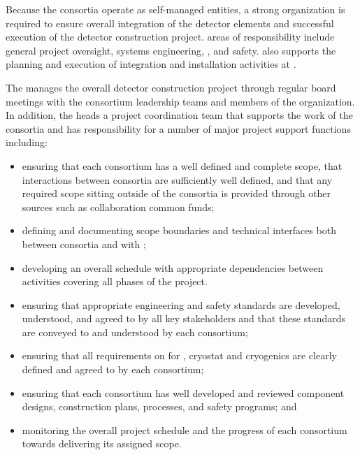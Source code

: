 Because the consortia operate as self-managed entities, a strong
 organization is required to ensure overall integration 
of the detector elements and successful execution of the detector
construction project.   areas of responsibility include 
general project oversight, systems engineering, , and 
safety.   also supports the planning and execution 
of integration and installation activities at .  

The  manages the overall detector construction project
through regular board meetings with the consortium leadership teams 
and members of the  organization.  
%
In addition, the  heads %
a project coordination team that supports the work of 
the consortia and has responsibility for a number of major project 
support functions including:
\begin{itemize}
\item ensuring that each consortium has a well defined and complete
  scope, that interactions between consortia are sufficiently 
  well defined, and that any required scope sitting outside of the 
  consortia is provided through other sources such as collaboration
  common funds;
\item defining and documenting scope boundaries and technical 
  interfaces both between consortia and with ;  
\item developing an overall schedule with appropriate dependencies
  between activities covering all phases of the project. 
\item ensuring that appropriate engineering and safety standards 
  are developed, understood, and agreed to by all key stakeholders 
  and that these standards are conveyed to and understood by each
  consortium;
\item ensuring that all  requirements on  
  for , cryostat and cryogenics are clearly defined and 
  agreed to by each consortium;
\item ensuring that each consortium has well developed and reviewed
  component designs, construction plans,  processes, and 
  safety programs; and
\item monitoring the overall project schedule and the progress of 
  each consortium towards delivering its assigned scope. 
\end{itemize}

